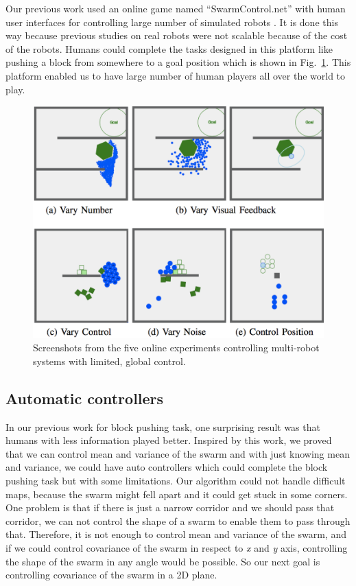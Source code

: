 \documentclass[letterpaper, 10 pt, conference]{ieeeconf}
\begin{document}
Our previous work used an online game named ``SwarmControl.net'' with human user interfaces for controlling large number of simulated robots \cite{swarmcontrol2013}. It is done this way because previous studies on real robots were not scalable because of the cost of the robots. Humans could complete the tasks designed in this platform like pushing a block from somewhere to a goal position which is shown in Fig.~\ref{fig:swarmcontrol.net}. This platform enabled us to have large number of human players all over the world to play. 
\begin{figure}[h]
\begin{center}
\includegraphics[width=\columnwidth]{SwarmBecker.png}
\caption{Screenshots from the five online experiments controlling multi-robot systems with limited, global control\cite{swarmcontrol2013}.
\label{fig:swarmcontrol.net}}
\end{center}
\end{figure} 


\subsection{Automatic controllers}

In our previous work for block pushing task, one surprising result was that humans with less information played better. Inspired by this work, we proved that we can control mean and variance of the swarm and with just knowing mean and variance, we could have auto controllers which could complete the block pushing task but with some limitations. Our algorithm could not handle difficult maps, because the swarm might fell apart and it could get stuck in some corners. One problem is that if there is just a narrow corridor and we should pass that corridor, we can not control the shape of a swarm to enable them to pass through that. Therefore, it is not enough to control mean and variance of the swarm, and if we could control covariance of the swarm in respect to \emph{x} and \emph{y} axis, controlling the shape of the swarm in any angle would be possible. So our next goal is controlling covariance of the swarm in a 2D plane.
\end{document}
